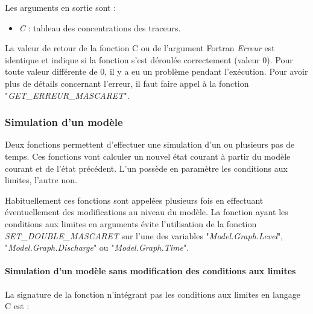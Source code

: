\documentclass[a4paper,11pt]{article}
\begin{document}
\vspace{0.5cm}
 
 Les arguments en sortie sont :
 
 \vspace{0.5cm}
 
 \begin{itemize}
    \item \textit{C} : tableau des concentrations des traceurs.
 \end{itemize}

\vspace{0.5cm}
  La valeur de retour de la fonction C ou de l'argument Fortran
  \textit{Erreur} est identique et indique si la fonction s'est
  d\'eroul\'ee correctement (valeur 0). Pour toute valeur diff\'erente
  de 0, il y a eu un probl\`eme pendant l'ex\'ecution. Pour avoir plus
  de d\'etails concernant l'erreur, il faut faire appel \`a la
  fonction "\textit{GET\_ERREUR\_MASCARET}".


\subsubsection{Simulation d'un mod\`ele}

 Deux fonctions permettent d'effectuer une simulation d'un ou plusieurs pas de temps. Ces fonctions vont calculer un nouvel \'etat courant \`a partir du mod\`ele courant et de l'\'etat pr\'ec\'edent. L'un poss\`ede en param\`etre les conditions aux limites, l'autre non.
 
 \vspace{0.5cm}
 
 Habituellement ces fonctions sont appel\'ees plusieurs fois en effectuant \'eventuellement des modifications au niveau du mod\`ele. La fonction ayant les conditions aux limites en arguments \'evite l'utilisation de la fonction \textit{SET\_DOUBLE\_MASCARET} sur l'une des variables "\textit{Model.Graph.Level}", "\textit{Model.Graph.Discharge}" ou "\textit{Model.Graph.Time}".
 
 \paragraph{Simulation d'un mod\`ele sans modification des conditions aux limites\\}

 \hspace*{1cm}
 
 La signature de la fonction n'int\'egrant pas les conditions aux limites en langage C est :
 
\end{document}
